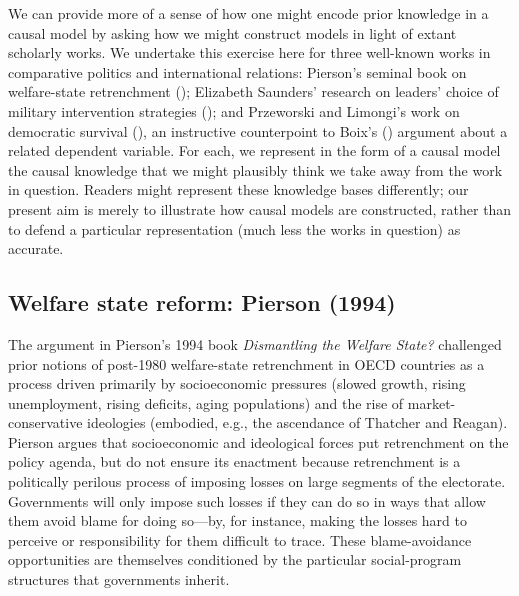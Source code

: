 \documentclass[12pt,]{book}
\begin{document}
We can provide more of a sense of how one might encode prior knowledge in a causal model by asking how we might construct models in light of extant scholarly works. We undertake this exercise here for three well-known works in comparative politics and international relations: Pierson's seminal book on welfare-state retrenchment (\citet{pierson1994dismantling}); Elizabeth Saunders' research on leaders' choice of military intervention strategies (\citet{saunders2011leaders}); and Przeworski and Limongi's work on democratic survival (\citet{przeworski1997modernization}), an instructive counterpoint to Boix's (\citet{boix2003democracy}) argument about a related dependent variable. For each, we represent in the form of a causal model the causal knowledge that we might plausibly think we take away from the work in question. Readers might represent these knowledge bases differently; our present aim is merely to illustrate how causal models are constructed, rather than to defend a particular representation (much less the works in question) as accurate.

\hypertarget{welfare-state-reform-pierson-1994}{%
\subsection{Welfare state reform: Pierson (1994)}\label{welfare-state-reform-pierson-1994}}

The argument in Pierson's 1994 book \emph{Dismantling the Welfare State?} challenged prior notions of post-1980 welfare-state retrenchment in OECD countries as a process driven primarily by socioeconomic pressures (slowed growth, rising unemployment, rising deficits, aging populations) and the rise of market-conservative ideologies (embodied, e.g., the ascendance of Thatcher and Reagan). Pierson argues that socioeconomic and ideological forces put retrenchment on the policy agenda, but do not ensure its enactment because retrenchment is a politically perilous process of imposing losses on large segments of the electorate. Governments will only impose such losses if they can do so in ways that allow them avoid blame for doing so---by, for instance, making the losses hard to perceive or responsibility for them difficult to trace. These blame-avoidance opportunities are themselves conditioned by the particular social-program structures that governments inherit.
\end{document}
